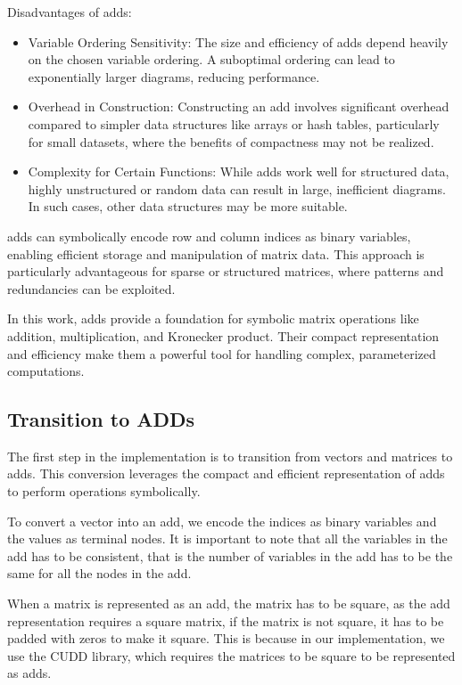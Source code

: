 Disadvantages of \glspl{add}:
\begin{itemize}
\item Variable Ordering Sensitivity: The size and efficiency of \glspl{add} depend heavily on the chosen variable ordering. A suboptimal ordering can lead to exponentially larger diagrams, reducing performance.
\item Overhead in Construction: Constructing an \gls{add} involves significant overhead compared to simpler data structures like arrays or hash tables, particularly for small datasets, where the benefits of compactness may not be realized.
\item Complexity for Certain Functions: While \glspl{add} work well for structured data, highly unstructured or random data can result in large, inefficient diagrams. In such cases, other data structures may be more suitable.
\end{itemize}

\glspl{add} can symbolically encode row and column indices as binary variables, enabling efficient storage and manipulation of matrix data.
This approach is particularly advantageous for sparse or structured matrices, where patterns and redundancies can be exploited.

In this work, \glspl{add} provide a foundation for symbolic matrix operations like addition, multiplication, and Kronecker product. Their compact representation and efficiency make them a powerful tool for handling complex, parameterized computations.

\subsection{Transition to ADDs}\label{subsec:transition-to-adds}
The first step in the implementation is to transition from vectors and matrices to \glspl{add}.
This conversion leverages the compact and efficient representation of \glspl{add} to perform operations symbolically.

To convert a vector into an \gls{add}, we encode the indices as binary variables and the values as terminal nodes.
It is important to note that all the variables in the \gls{add} has to be consistent, that is the number of variables in the \gls{add} has to be the same for all the nodes in the \gls{add}.

When a matrix is represented as an \gls{add}, the matrix has to be square, as the \gls{add} representation requires a square matrix, if the matrix is not square, it has to be padded with zeros to make it square.
This is because in our implementation, we use the CUDD library, which requires the matrices to be square to be represented as \glspl{add}.

